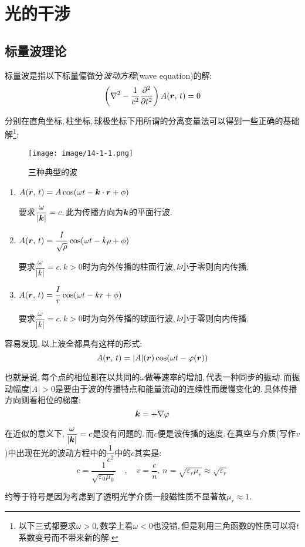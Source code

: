 \chapter{光的干涉}


\section{标量波理论}
标量波是指以下标量偏微分\emph{波动方程}(wave equation)的解:
\[\left(\nabla^2 -\frac{1}{c^2}\frac{\partial^2}{\partial t^2}\right)A(\boldsymbol{r},\,t)=0\]

分别在直角坐标,\,柱坐标,\,球极坐标下用所谓的分离变量法可以得到一些正确的基础解\footnote{以下三式都要求$\omega >0$,\,数学上看$\omega<0$也没错,\,但是利用三角函数的性质可以将$t$系数变号而不带来新的解.}:
\begin{figure}[H]
\centering
\texttt{[image: image/14-1-1.png]}
\caption{三种典型的波}
\end{figure}

\begin{enumerate}
	\item $A(\boldsymbol{r},\,t)=A\cos(\omega t-\boldsymbol{k}\cdot \boldsymbol{r}+\phi)$

	要求$\dfrac{\omega}{|\boldsymbol{k}|}=c$.\,此为传播方向为$\boldsymbol{k}$的平面行波.
	\item $A(\boldsymbol{r},\,t)=\dfrac{I}{\sqrt{\rho}}\cos(\omega t-k\rho+\phi)$

	要求$\dfrac{\omega}{|k|}=c$.\,$k>0$时为向外传播的柱面行波,\,$k$小于零则向内传播.
	\item $A(\boldsymbol{r},\,t)=\dfrac{I}{r}\cos(\omega t-kr+\phi)$

	要求$\dfrac{\omega}{|k|}=c$.\,$k>0$时为向外传播的球面行波,\,$k$小于零则向内传播.
\end{enumerate}

容易发现,\,以上波全都具有这样的形式:
\[A(\boldsymbol{r},\,t)=|A|(\boldsymbol{r})\cos(\omega t-\varphi(\boldsymbol{r}))\]

也就是说,\,每个点的相位都在以共同的$\omega$做等速率的增加,\,代表一种同步的振动.\,而振动幅度$|A|>0$是要由于波的传播特点和能量流动的连续性而缓慢变化的.\,具体传播方向则看相位的梯度:
\[\boldsymbol{k}=+\nabla \varphi\]

在近似的意义下,\,$\dfrac{\omega}{|\boldsymbol{k}|}=c$是没有问题的.\,而$c$便是波传播的速度.\,在真空与介质(写作$v$)中出现在光的波动方程中的$\dfrac{1}{c^2}$中的$c$其实是:
\[c=\frac{1}{\sqrt{\varepsilon_0\mu_0}}\quad ,\quad v=\frac{c}{n},\,n=\sqrt{\varepsilon_r\mu_r}\approx \sqrt{\varepsilon_r}\]

约等于符号是因为考虑到了透明光学介质一般磁性质不显著故$\mu_r\approx 1$.

